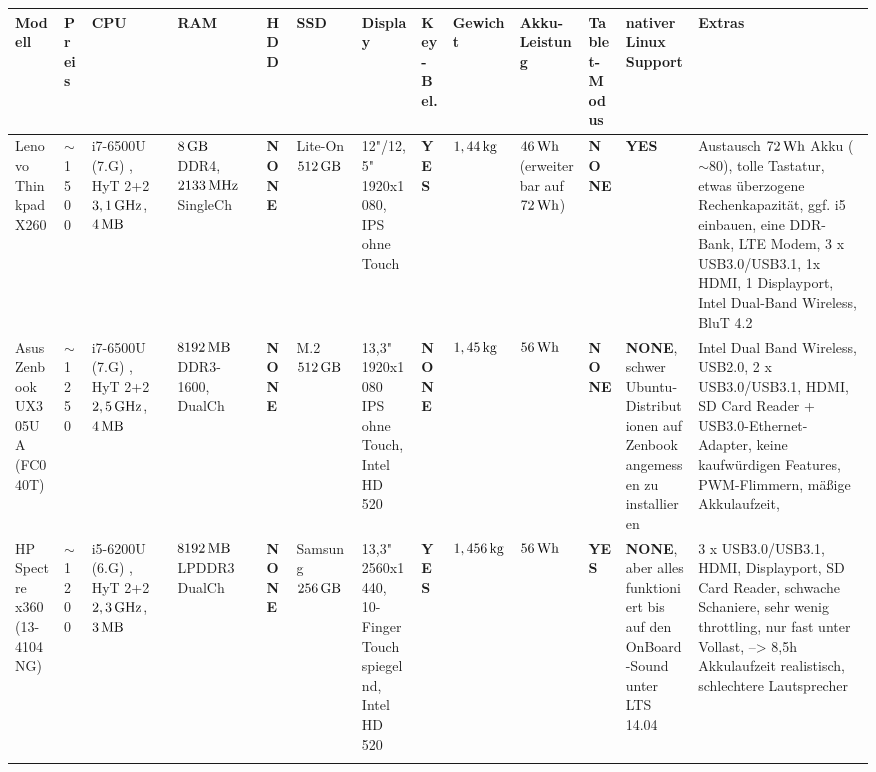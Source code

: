 \documentclass[numbers=noenddot,a4paper]{scrartcl}
\newcommand{\fett}[1]{\textbf{#1}}  %
\begin{document}
	\newpage
	
	\thispagestyle{empty}
	
	\begin{landscape}
				
		\begin{table}[h]
			
			\begin{tabular}{m{1.25cm}|m{1cm}|m{1.75cm}|m{1.5cm}|m{1.5cm}|m{1.5cm}|m{2.5cm}|m{1cm}|m{1.5cm}|m{1.5cm}|m{1cm}|m{3cm}|m{3cm}}
				
				Modell & Preis & CPU & RAM & HDD & SSD & Display & Key-Bel. & Gewicht & Akku-Leistung & Tablet-Modus & nativer Linux Support & Extras \\ \hline\hline
				
				Lenovo Thinkpad X260 & $\sim$1500\texteuro & i7-6500U (7.G) , HyT 2+2 $\unit[3,1]{GHz}$, $\unit[4]{MB}$ & $\unit[8]{GB}$ DDR4, $\unit[2133]{MHz}$ SingleCh & \fett{NONE} & Lite-On $\unit[512]{GB}$ & 12"/12,5" 1920x1080, IPS ohne Touch & \fett{YES} & $\unit[1,44]{kg}$ & $\unit[46]{Wh}$ (erweiterbar auf $\unit[72]{Wh}$) & \fett{NONE} & \fett{YES} & Austausch $\unit[72]{Wh}$ Akku ($\sim$80\texteuro), tolle Tastatur, etwas überzogene Rechenkapazität, ggf. i5 einbauen, eine DDR-Bank, LTE Modem, 3 x USB3.0/USB3.1, 1x HDMI, 1 Displayport, Intel Dual-Band Wireless, BluT 4.2 \\ \hline
				
				Asus Zenbook UX305UA (FC040T) & $\sim$1250\texteuro & i7-6500U (7.G) , HyT 2+2 $\unit[2,5]{GHz}$, $\unit[4]{MB}$ & $\unit[8192]{MB}$ DDR3-1600, DualCh & \fett{NONE} & M.2 $\unit[512]{GB}$ & 13,3" 1920x1080 IPS ohne Touch, Intel HD 520 & \fett{NONE} & $\unit[1,45]{kg}$ & $\unit[56]{Wh}$ & \fett{NONE} & \fett{NONE}, schwer Ubuntu-Distributionen auf Zenbook angemessen zu installieren & Intel Dual Band Wireless, USB2.0, 2 x USB3.0/USB3.1, HDMI, SD Card Reader + USB3.0-Ethernet-Adapter, keine kaufwürdigen Features, PWM-Flimmern, mäßige Akkulaufzeit,  \\ \hline
				
				HP Spectre x360 (13-4104NG) & $\sim$1200\texteuro & i5-6200U (6.G) , HyT 2+2 $\unit[2,3]{GHz}$, $\unit[3]{MB}$ & $\unit[8192]{MB}$ LPDDR3 DualCh & \fett{NONE} & Samsung $\unit[256]{GB}$ & 13,3" 2560x1440, 10-Finger Touch spiegelnd, Intel HD 520 & \fett{YES} & $\unit[1,456]{kg}$ & $\unit[56]{Wh}$ & \fett{YES} & \fett{NONE}, aber alles funktioniert bis auf den OnBoard-Sound unter LTS 14.04  & 3 x USB3.0/USB3.1, HDMI, Displayport, SD Card Reader, schwache Schaniere, sehr wenig throttling, nur fast unter Vollast, --> 8,5h Akkulaufzeit realistisch, schlechtere Lautsprecher \\ \hline
				
				& & & & & & & & & & & & \\
					
			\end{tabular}
			
		\end{table}
			
		\end{landscape}
		
\end{document}
